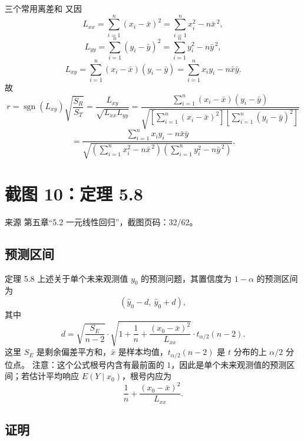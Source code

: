 \documentclass[UTF8,zihao=-4,fontset=fandol]{ctexart}
\begin{document}
\begin{keybox}{三个常用离差和}
又因
\[
L_{xx}
=\sum_{i=1}^{n}(x_i-\bar{x})^2
=\sum_{i=1}^{n}x_i^2-n\bar{x}^{\,2},
\]
\[
L_{yy}
=\sum_{i=1}^{n}(y_i-\bar{y})^2
=\sum_{i=1}^{n}y_i^2-n\bar{y}^{\,2},
\]
\[
L_{xy}
=\sum_{i=1}^{n}(x_i-\bar{x})(y_i-\bar{y})
=\sum_{i=1}^{n}x_iy_i-n\bar{x}\bar{y}.
\]
故
\[
r
=\operatorname{sgn}(L_{xy})\sqrt{\frac{S_R}{S_T}}
=
\frac{L_{xy}}{\sqrt{L_{xx}L_{yy}}}
=
\frac{\sum_{i=1}^{n}(x_i-\bar{x})(y_i-\bar{y})}
{\sqrt{
\left[\sum_{i=1}^{n}(x_i-\bar{x})^2\right]
\left[\sum_{i=1}^{n}(y_i-\bar{y})^2\right]
}}
\]
\[
=
\frac{\sum_{i=1}^{n}x_iy_i-n\bar{x}\bar{y}}
{\sqrt{
\left(\sum_{i=1}^{n}x_i^2-n\bar{x}^{\,2}\right)
\left(\sum_{i=1}^{n}y_i^2-n\bar{y}^{\,2}\right)
}}.
\]
\end{keybox}

\section{截图 10：定理 5.8}

\begin{sourcebox}{来源}
第五章“5.2 一元线性回归”，截图页码：32/62。
\end{sourcebox}

\subsection{预测区间}

\begin{keybox}{定理 5.8}
上述关于单个未来观测值 $y_0$ 的预测问题，其置信度为 $1-\alpha$ 的预测区间为
\[
(\hat{y}_0-d,\ \hat{y}_0+d),
\]
其中
\[
d=
\sqrt{\frac{S_E}{n-2}}\cdot
\sqrt{1+\frac{1}{n}+\frac{(x_0-\bar{x})^2}{L_{xx}}}\cdot
t_{\alpha/2}(n-2).
\]
这里 $S_E$ 是剩余偏差平方和，$\bar{x}$ 是样本均值，$t_{\alpha/2}(n-2)$ 是 $t$ 分布的上 $\alpha/2$ 分位点。
注意：这个公式根号内含有最前面的 $1$，因此是单个未来观测值的预测区间；若估计平均响应 $E(Y\mid x_0)$，根号内应为
\[
\frac{1}{n}+\frac{(x_0-\bar{x})^2}{L_{xx}}.
\]
\end{keybox}

\subsection{证明}
\end{document}
